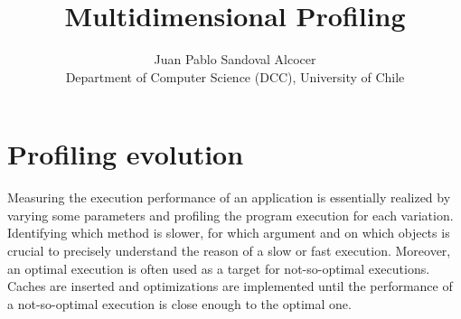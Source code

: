\documentclass[10pt, conference, compsocconf]{IEEEtran}
\newcommand{\Title}{Multidimensional Profiling}
\newcommand{\TitleShort}{\Title}
\newcommand{\Authors}{Juan Pablo Sandoval Alcocer}
\newcommand{\AuthorsShort}{J. P. Sandoval}
\newcommand{\seclabel}[1]{\label{sec:#1}}
\begin{document}
\title{\Title}

\author{\Authors\\%
Department of Computer Science (DCC), University of Chile
} 

\maketitle


%
%
%
%

\section{Profiling evolution}\seclabel{problem}

Measuring the execution performance of an application is essentially realized by varying some parameters and profiling the program execution for each variation. Identifying which method is slower, for which argument and on which objects is crucial to precisely understand the reason of a slow or fast execution. Moreover, an optimal execution is often used as a target for not-so-optimal executions. Caches are inserted and optimizations are implemented until the performance of a not-so-optimal execution is close enough to the optimal one.
\end{document}
